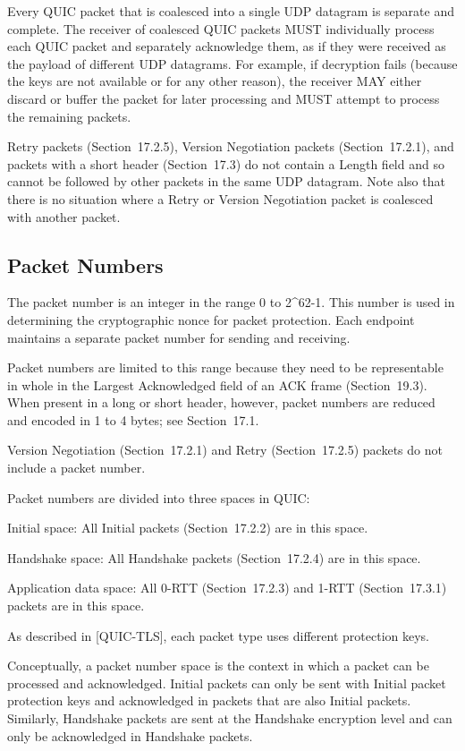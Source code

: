 \documentclass{article}
\begin{document}
Every QUIC packet that is coalesced into a single UDP datagram is separate and complete.  The receiver of coalesced QUIC packets MUST individually process each QUIC packet and separately acknowledge them, as if they were received as the payload of different UDP datagrams.  For example, if decryption fails (because the keys are not available or for any other reason), the receiver MAY either discard or buffer the packet for later processing and MUST attempt to process the remaining packets.

Retry packets (Section~17.2.5), Version Negotiation packets (Section~17.2.1), and packets with a short header (Section~17.3) do not contain a Length field and so cannot be followed by other packets in the same UDP datagram.  Note also that there is no situation where a Retry or Version Negotiation packet is coalesced with another packet.

\subsection{Packet Numbers}

The packet number is an integer in the range 0 to 2\textasciicircum{}62-1.  This number is used in determining the cryptographic nonce for packet protection.  Each endpoint maintains a separate packet number for sending and receiving.

Packet numbers are limited to this range because they need to be representable in whole in the Largest Acknowledged field of an ACK frame (Section~19.3).  When present in a long or short header, however, packet numbers are reduced and encoded in 1 to 4 bytes; see Section~17.1.

Version Negotiation (Section~17.2.1) and Retry (Section~17.2.5) packets do not include a packet number.

Packet numbers are divided into three spaces in QUIC:

Initial space:  All Initial packets (Section~17.2.2) are in this space.

Handshake space:  All Handshake packets (Section~17.2.4) are in this space.

Application data space:  All 0-RTT (Section~17.2.3) and 1-RTT (Section~17.3.1) packets are in this space.

As described in [QUIC-TLS], each packet type uses different protection keys.

Conceptually, a packet number space is the context in which a packet can be processed and acknowledged.  Initial packets can only be sent with Initial packet protection keys and acknowledged in packets that are also Initial packets.  Similarly, Handshake packets are sent at the Handshake encryption level and can only be acknowledged in Handshake packets.
\end{document}
